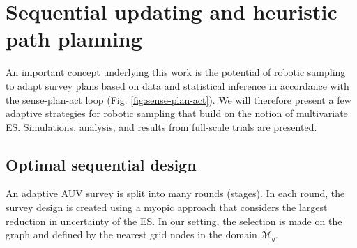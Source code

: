 \documentclass[aoas]{imsart}
\begin{document}





\section{Sequential updating and heuristic path planning}\label{sec:heuristics}

An important concept underlying this work is the potential of robotic sampling to adapt survey plans based on data and statistical inference
in accordance with the sense-plan-act loop
(Fig. \ref{fig:sense-plan-act}). We will therefore present a few adaptive strategies
for robotic sampling that build on the notion of multivariate ES. Simulations, analysis, and  results from full-scale trials are presented.

\subsection{Optimal sequential design}
\label{Optdes}

An adaptive AUV survey is split into many rounds (stages). In each
round, the survey design is created using a myopic approach that considers the largest reduction in uncertainty of the ES. In our
setting, the selection is made on the graph and defined by the nearest grid
nodes in the domain $\mathcal{M}_g$.
\end{document}
